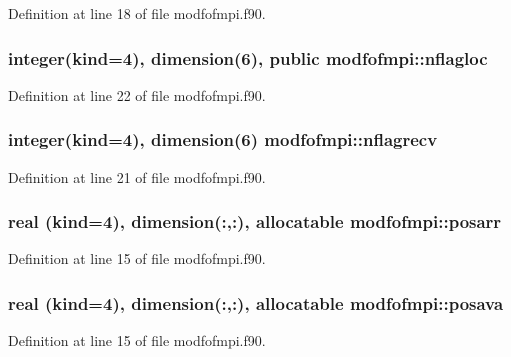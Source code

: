 Definition at line 18 of file modfofmpi.\-f90.

\hypertarget{classmodfofmpi_a9b2252c09a83a3f47fc6aec6462a68dc}{
\subsubsection[{nflagloc}]{\setlength{\rightskip}{0pt plus 5cm}integer(kind=4), dimension(6), public modfofmpi\-::nflagloc}}\label{classmodfofmpi_a9b2252c09a83a3f47fc6aec6462a68dc}


Definition at line 22 of file modfofmpi.\-f90.

\hypertarget{classmodfofmpi_aa8c0fc08baf8d208d7e2cddd0600ff99}{
\subsubsection[{nflagrecv}]{\setlength{\rightskip}{0pt plus 5cm}integer(kind=4), dimension(6) modfofmpi\-::nflagrecv}}\label{classmodfofmpi_aa8c0fc08baf8d208d7e2cddd0600ff99}


Definition at line 21 of file modfofmpi.\-f90.

\hypertarget{classmodfofmpi_a240c326e64798f0d4f7fd2a785eaddfb}{
\subsubsection[{posarr}]{\setlength{\rightskip}{0pt plus 5cm}real (kind=4), dimension(\-:,\-:), allocatable modfofmpi\-::posarr}}\label{classmodfofmpi_a240c326e64798f0d4f7fd2a785eaddfb}


Definition at line 15 of file modfofmpi.\-f90.

\hypertarget{classmodfofmpi_a91f992ee7447a7fb3c5430233f3f39ab}{
\subsubsection[{posava}]{\setlength{\rightskip}{0pt plus 5cm}real (kind=4), dimension(\-:,\-:), allocatable modfofmpi\-::posava}}\label{classmodfofmpi_a91f992ee7447a7fb3c5430233f3f39ab}


Definition at line 15 of file modfofmpi.\-f90.

